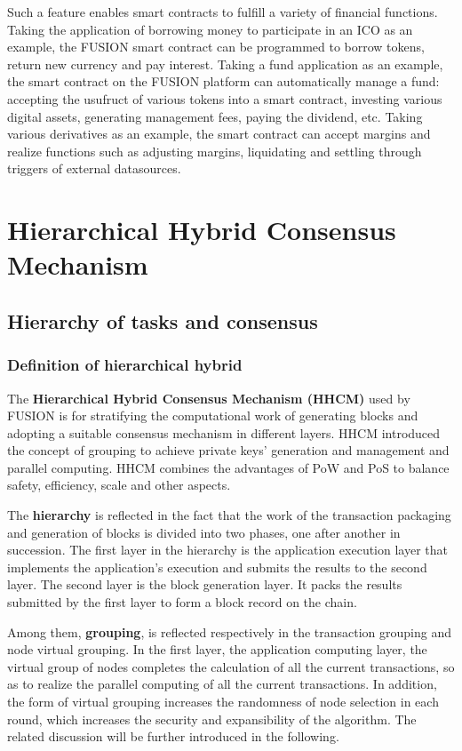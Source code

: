 \documentclass[a4paper,12pt]{article}
\begin{document}
Such a feature enables smart contracts to fulfill a variety of financial functions. Taking the application of borrowing money to participate in an ICO as an example, the FUSION smart contract can be programmed to borrow tokens, return new currency and pay interest. Taking a fund application as an example, the smart contract on the FUSION platform can automatically manage a fund: accepting the usufruct of various tokens into a smart contract, investing various digital assets, generating management fees, paying the dividend, etc. Taking various derivatives as an example, the smart contract can accept margins and realize functions such as adjusting margins, liquidating and settling through triggers of external datasources.

\section{Hierarchical Hybrid Consensus Mechanism}

\subsection{Hierarchy of tasks and consensus}

\subsubsection{Definition of hierarchical hybrid}

The {\bfseries Hierarchical Hybrid Consensus Mechanism (HHCM)} used by FUSION is for stratifying the computational work of generating blocks and adopting a suitable consensus mechanism in different layers. HHCM introduced the concept of grouping to achieve private keys' generation and management and parallel computing. HHCM combines the advantages of PoW and PoS to balance safety, efficiency, scale and other aspects.

The {\bfseries hierarchy} is reflected in the fact that the work of the transaction packaging and generation of blocks is divided into two phases, one after another in succession. The first layer in the hierarchy is the application execution layer that implements the application's execution and submits the results to the second layer. The second layer is the block generation layer. It packs the results submitted by the first layer to form a block record on the chain.

Among them, {\bfseries grouping}, is reflected respectively in the transaction grouping and node virtual grouping. In the first layer, the application computing layer, the virtual group of nodes completes the calculation of all the current transactions, so as to realize the parallel computing of all the current transactions. In addition, the form of virtual grouping increases the randomness of node selection in each round, which increases the security and expansibility of the algorithm. The related discussion will be further introduced in the following.
\end{document}
